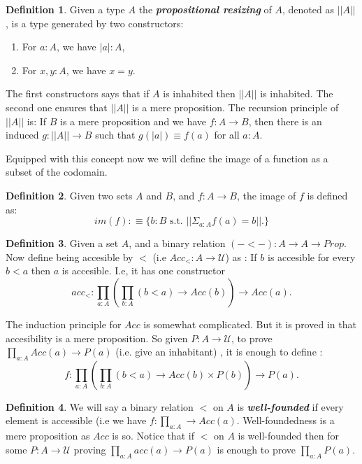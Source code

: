 \documentclass[11pt]{article}
\theoremstyle{definition}
\newtheorem{definition}{Definition}[section]
\theoremstyle{plain}
\theoremstyle{remark}
\newcommand{\U}{\mathscr{U}}
\begin{document}
\begin{definition}\label{D:Prop resize}
Given a type $A$ the \textbf{\textit{propositional resizing}} of $A$, denoted as $|| A ||$, is
a type generated by two constructors:
\begin{enumerate}
\item For $a : A$, we have $|a| : A$,
\item For $x,y : A$, we have $x = y$.
\end{enumerate}
The first constructors says that if $A$ is inhabited then $|| A ||$ is inhabited. The second
one ensures that $|| A ||$ is a mere proposition. The recursion principle of $|| A ||$ is:
If $B$ is a mere proposition and we have $f : A \to B$, then there is an induced 
$g : || A || \to B$ such that $g(|a|) \equiv f(a)$ for all $a : A$. 
\end{definition}
 
Equipped with this concept now we will define the image of a function as a subset of the 
codomain. 

\begin{definition}
Given two sets $A$ and $B$, and $f : A \to B$, the image of $f$ is defined as:
\[ im(f) :\equiv \{ b : B \text{ s.t. } || \Sigma_{a : A} f(a) = b|| .\}\]
\end{definition}


\begin{definition}
Given a set $A$, and a binary relation $(-<-) : A \to A \to Prop$. Now define being 
accesible by $<$ (i.e $Acc_{<} : A \to \U$) as : If $b$ is accesible for every $b<a$ 
then $a$ is accesible. I.e, it has one constructor 
\[ acc_< : \prod_{a : A} \left( \prod_{b : A} (b<a) \to Acc(b) \right) \to Acc(a). \]
\end{definition}

The induction principle for $Acc$ is somewhat complicated. But it is proved in \cite{Hott} 
that accesibility is a mere proposition. So given $P : A \to \U$, to prove 
$\prod_{a : A} Acc(a) \to P(a)$ (i.e. give an inhabitant) , it is enough to define :
\[ f : \prod_{a : A} \left( \prod_{b : A} (b<a) \to Acc(b) \times P(b) \right) \to P(a) .\]

\begin{definition}\label{D:WF}
We will say a binary relation $<$ on $A$ is \textbf{\textit{well-founded}} if every element
is accessible (i.e we have $f : \prod_{a : A} \to Acc(a)$. Well-foundedness is a mere 
proposition as $Acc$ is so. Notice that if $<$ on $A$ is well-founded then for some 
$P : A \to \U$ proving $\prod_{a:A} acc(a) \to P(a)$ is enough to prove $\prod_{a : A} P(a)$.
\end{definition}
\end{document}
